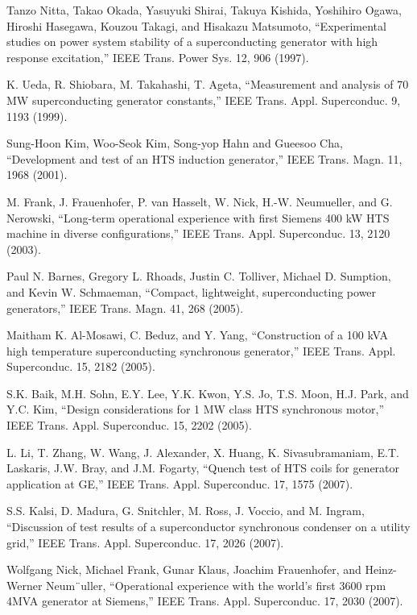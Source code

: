 \noindent [9.65] Tanzo Nitta, Takao Okada, Yasuyuki Shirai, Takuya Kishida, Yoshihiro Ogawa,
Hiroshi Hasegawa, Kouzou Takagi, and Hisakazu Matsumoto, ``Experimental studies
on power system stability of a superconducting generator with high response
excitation,” IEEE Trans. Power Sys. 12, 906 (1997).

\noindent [9.66] K. Ueda, R. Shiobara, M. Takahashi, T. Ageta, ``Measurement and analysis of 70
MW superconducting generator constants,” IEEE Trans. Appl. Superconduc. 9,
1193 (1999).

\noindent [9.67] Sung-Hoon Kim, Woo-Seok Kim, Song-yop Hahn and Gueesoo Cha, ``Development
and test of an HTS induction generator,” IEEE Trans. Magn. 11, 1968 (2001).

\noindent [9.68] M. Frank, J. Frauenhofer, P. van Hasselt, W. Nick, H.-W. Neumueller, and G. Nerowski,
``Long-term operational experience with first Siemens 400 kW HTS machine
in diverse configurations,” IEEE Trans. Appl. Superconduc. 13, 2120 (2003).

\noindent [9.69] Paul N. Barnes, Gregory L. Rhoads, Justin C. Tolliver, Michael D. Sumption,
and Kevin W. Schmaeman, ``Compact, lightweight, superconducting power generators,”
IEEE Trans. Magn. 41, 268 (2005).

\noindent [9.70] Maitham K. Al-Mosawi, C. Beduz, and Y. Yang, ``Construction of a 100 kVA high
temperature superconducting synchronous generator,” IEEE Trans. Appl. Superconduc.
15, 2182 (2005).

\noindent [9.71] S.K. Baik, M.H. Sohn, E.Y. Lee, Y.K. Kwon, Y.S. Jo, T.S. Moon, H.J. Park, and
Y.C. Kim, ``Design considerations for 1 MW class HTS synchronous motor,” IEEE
Trans. Appl. Superconduc. 15, 2202 (2005).

\noindent [9.72] L. Li, T. Zhang, W. Wang, J. Alexander, X. Huang, K. Sivasubramaniam, E.T.
Laskaris, J.W. Bray, and J.M. Fogarty, ``Quench test of HTS coils for generator
application at GE,” IEEE Trans. Appl. Superconduc. 17, 1575 (2007).

\noindent [9.73] S.S. Kalsi, D. Madura, G. Snitchler, M. Ross, J. Voccio, and M. Ingram, ``Discussion
of test results of a superconductor synchronous condenser on a utility grid,”
IEEE Trans. Appl. Superconduc. 17, 2026 (2007).

\noindent [9.74] Wolfgang Nick, Michael Frank, Gunar Klaus, Joachim Frauenhofer, and Heinz-
Werner Neum¨uller, ``Operational experience with the world’s first 3600 rpm 4MVA
generator at Siemens,” IEEE Trans. Appl. Superconduc. 17, 2030 (2007).


